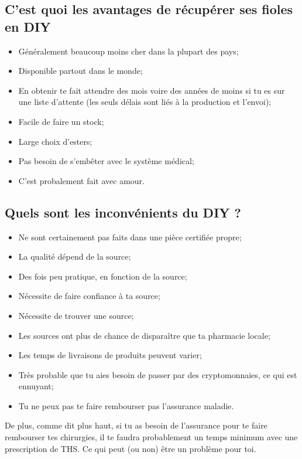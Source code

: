 \documentclass{article}
\begin{document}
\subsection{C'est quoi les avantages de récupérer ses fioles en DIY}

\begin{itemize}
\item Généralement beaucoup moins cher dans la plupart des pays;
\item Disponible partout dans le monde;
\item En obtenir te fait attendre des mois voire des années de moins si tu es sur une liste d'attente (les seuls délais sont liés à la production et l'envoi);
\item Facile de faire un stock;
\item Large choix d'esters;
\item Pas besoin de s'embêter avec le système médical;
\item C'est probalement fait avec amour.
\end{itemize}

\subsection{Quels sont les inconvénients du DIY ?}

\begin{itemize}
  \item Ne sont certainement pas faits dans une pièce certifiée propre;
  \item La qualité dépend de la source;
  \item Des fois peu pratique, en fonction de la source;
  \item Nécessite de faire confiance à ta source;
  \item Nécessite de trouver une source;
  \item Les sources ont plus de chance de disparaître que ta pharmacie locale;
  \item Les temps de livraisons de produits peuvent varier;
  \item Très probable que tu aies besoin de passer par des cryptomonnaies, ce qui est ennuyant;
  \item Tu ne peux pas te faire rembourser pas l'assurance maladie.
\end{itemize}
De plus, comme dit plus haut, si tu as besoin de l'assurance pour te faire rembourser tes chirurgies, il te faudra probablement un temps minimum avec une prescription de THS. Ce qui peut (ou non) être un problème pour toi.
\end{document}

